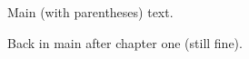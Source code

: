 \documentclass{article}
\begin{document}
Main (with parentheses) text.

Back in main after chapter one (still fine).
\undefinedinmain
\end{document}
